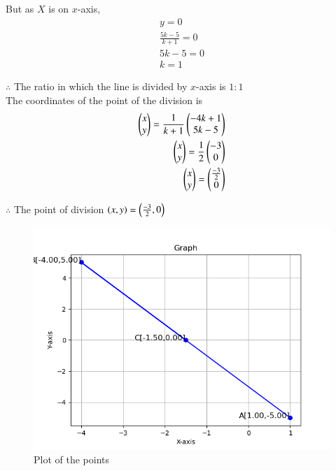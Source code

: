 \documentclass[journal]{IEEEtran}
\begin{document}
But as $X$ is on $x$-axis,
\begin{align}
y=0\\
\frac{5k-5}{k+1}=0 \label{eq1.1.5.10.6} \\
5k-5=0 \label{eq1.1.5.10.7} \\
k=1 \label{eq1.1.5.10.8}
\end{align}

$\therefore$ The ratio in which the line is divided by $x$-axis is $1:1$ \\
The coordinates of the point of the division is \\
\begin{align}
\begin{pmatrix}
x \\
y \\
\end{pmatrix}
=\frac{1}{k+1}
\begin{pmatrix}
-4k+1 \\
5k-5 \\
\end{pmatrix} \label{eq1.1.5.10.9}
\\
\begin{pmatrix}
x \\
y\\
\end{pmatrix}
=\frac{1}{2}
\begin{pmatrix}
-3 \\
0 \\
\end{pmatrix} \label{eq1.1.5.10.10}
\\
\begin{pmatrix}
x \\
y \\
\end{pmatrix}
=
\begin{pmatrix}
\frac{-3}{2} \\
0 \\
\end{pmatrix} \label{eq1.1.5.10.11}
\end{align}

$\therefore$ The point of division $\left(x,y\right)=\begin{pmatrix}\frac{-3}{2},0\end{pmatrix}$

\begin{figure}[h!]
\renewcommand{\thefigure}{1}
    \centering
    \includegraphics[width=0.7\linewidth]{figs/plot.png}
    \caption{Plot of the points}
    \label{fig1.1.5.10.1}
\end{figure}
\end{document}
